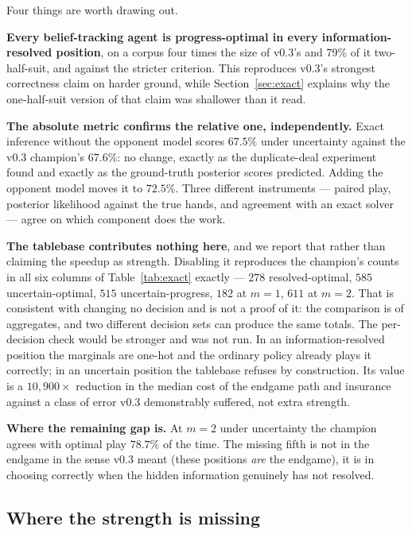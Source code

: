\documentclass[11pt,letterpaper]{article}
\begin{document}
Four things are worth drawing out.

\textbf{Every belief-tracking agent is progress-optimal in every
information-resolved position}, on a corpus four times the size of v0.3's and
79\% of it two-half-suit, and against the stricter criterion. This reproduces
v0.3's strongest correctness claim on harder ground, while
Section~\ref{sec:exact} explains why the one-half-suit version of that claim was
shallower than it read.

\textbf{The absolute metric confirms the relative one, independently.} Exact
inference without the opponent model scores $67.5\%$ under uncertainty against
the v0.3 champion's $67.6\%$: no change, exactly as the duplicate-deal
experiment found and exactly as the ground-truth posterior scores predicted.
Adding the opponent model moves it to $72.5\%$. Three different instruments ---
paired play, posterior likelihood against the true hands, and agreement with an
exact solver --- agree on which component does the work.

\textbf{The tablebase contributes nothing here}, and we report that rather than
claiming the speedup as strength. Disabling it reproduces the champion's
counts in all six columns of Table~\ref{tab:exact} exactly --- $278$
resolved-optimal, $585$ uncertain-optimal, $515$ uncertain-progress, $182$ at
$m{=}1$, $611$ at $m{=}2$. That is consistent with changing no decision and is
not a proof of it: the comparison is of aggregates, and two different decision
sets can produce the same totals. The per-decision check would be stronger and
was not run. In an information-resolved position the marginals are one-hot and the
ordinary policy already plays it correctly; in an uncertain position the
tablebase refuses by construction. Its value is a $10{,}900\times$ reduction in
the median cost of the endgame path and insurance against a class of error v0.3
demonstrably suffered, not extra strength.

\textbf{Where the remaining gap is.} At $m{=}2$ under uncertainty the champion
agrees with optimal play $78.7\%$ of the time. The missing fifth is not in the
endgame in the sense v0.3 meant (these positions \emph{are} the endgame), it
is in choosing correctly when the hidden information genuinely has not resolved.

\subsection{Where the strength is missing}
\label{sec:missing}
\end{document}

